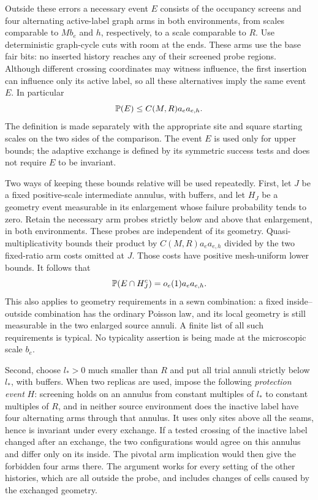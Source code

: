 Outside these errors a necessary event $E$ consists of the occupancy
screens and four alternating active-label graph arms in both environments,
from scales comparable to $M b_e$ and $h$, respectively, to a scale
comparable to $R$.  Use deterministic graph-cycle cuts with room at the
ends.  These arms use the base fair bits: no inserted history reaches any
of their screened probe regions.  Although different crossing coordinates
may witness influence, the first insertion can influence only its active
label, so all these alternatives imply the same event $E$.  In particular
\begin{equation}
 \mathbb P(E)\leq C(M,R)a_ea_{e,h}.
 \label{eq:necessary-probes-upper}
\end{equation}
The definition is made separately with the appropriate site and square
starting scales on the two sides of the comparison.  The event $E$ is
used only for upper bounds; the adaptive exchange is defined by its
symmetric success tests and does not require $E$ to be invariant.

Two ways of keeping these bounds relative will be used repeatedly.
First, let $J$ be a fixed positive-scale intermediate annulus, with
buffers, and let $H_J$ be a geometry event measurable in its enlargement
whose failure probability tends to zero.  Retain the necessary arm probes
strictly below and above that enlargement, in both environments.  These
probes are independent of its geometry.  Quasi-multiplicativity bounds
their product by $C(M,R)a_ea_{e,h}$ divided by the two fixed-ratio arm
costs omitted at $J$.  Those costs have positive mesh-uniform lower
bounds.  It follows that
\begin{equation}
 \mathbb P(E\cap H_J^c)=o_e(1)a_ea_{e,h}.
 \label{eq:relative-typical-geometry}
\end{equation}
This also applies to geometry requirements in a sewn combination: a fixed
inside--outside combination has the ordinary Poisson law, and its local
geometry is still measurable in the two enlarged source annuli.  A finite
list of all such requirements is typical.  No typicality assertion is
being made at the microscopic scale $b_e$.

Second, choose $l_*>0$ much smaller than $R$ and put all trial annuli
strictly below $l_*$, with buffers.  When two replicas are used, impose the
following \emph{protection event} $H$: screening holds on an annulus from
constant multiples of $l_*$ to constant multiples of $R$, and in neither
source environment does the inactive label have four alternating arms
through that annulus.  It uses only sites above all the seams, hence is
invariant under every exchange.  If a tested crossing of the inactive
label changed after an exchange, the two configurations would agree on
this annulus and differ only on its inside.  The pivotal arm implication
would then give the forbidden four arms there.  The argument works for
every setting of the other histories, which are all outside the probe,
and includes changes of cells caused by the exchanged geometry.

